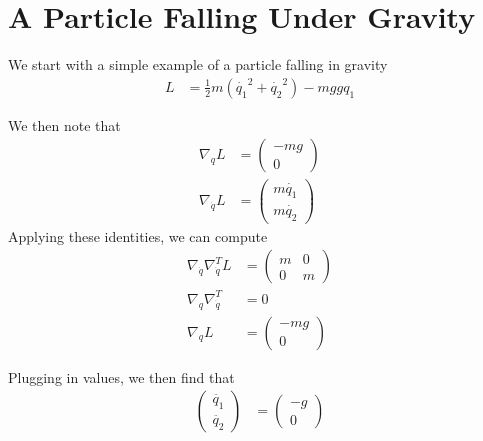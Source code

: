 \documentclass[book.tex]{subfiles}
\begin{document}
\section{A Particle Falling Under Gravity}

We start with a simple example of a particle falling in gravity
\begin{align}
    L &= \frac{1}{2} m(\dot{q_1}^2 + \dot{q_2}^2 ) - m ggq_1
\end{align}

We then note that
\begin{align}
\nabla_q L &= \begin{pmatrix}
    -mg \\
    0 
    \end{pmatrix} \\
\nabla_{\dot{q}} L &= \begin{pmatrix}
    m \dot{q_1} \\
    m \dot{q_2}
    \end{pmatrix}
\end{align}
Applying these identities, we can compute
\begin{align}
\nabla_{\dot{q}} \nabla_{\dot{q}}^T L &= \begin{pmatrix}
    m & 0 \\
    0 & m 
    \end{pmatrix} \\
\nabla_q \nabla_{\dot{q}}^T &= 0 \\
\nabla_q L &= \begin{pmatrix}
-mg \\
0
\end{pmatrix}
\end{align}

Plugging in values, we then find that
\begin{align}
\begin{pmatrix}
\ddot{q_1} \\
\ddot{q_2}
\end{pmatrix}
&= \begin{pmatrix}
-g \\
0 
\end{pmatrix}
\end{align}




\end{document}
